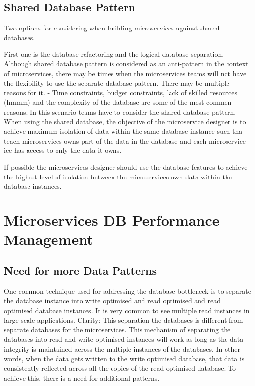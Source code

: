 \documentclass[a4paper, 11pt]{book}
\begin{document}
    \section{Shared Database Pattern}
    Two options for considering when building microservices against shared databases.

    First one is the database refactoring and the logical database separation.
    Although shared database pattern is considered as an anti-pattern in the context of microservices, there may be times when the microservices teams will not have the flexibility to use the separate database pattern.
    There may be multiple reasons for it.
    - Time constraints, budget constraints, lack of skilled resources (hmmm) and the complexity of the database are some of the most common reasons.
    In this scenario teams have to consider the shared database pattern.
    When using the shared database, the objective of the microservice designer is to achieve maximum isolation of data within the same database instance such tha teach microservices owns part of the data in the database and each microservice ice has access to only the data it owns.

    If possible the microservices designer should use the database features to achieve the highest level of isolation between the microservices own data within the database instances.


    \chapter{Microservices DB Performance Management}


    \section{Need for more Data Patterns}
    One common technique used for addressing the database bottleneck is to separate the database instance into write optimised and read optimised and read optimised database instances.
    It is very common to see multiple read instances in large scale applications.
    Clarity: This separation the databases is different from separate databases for the microservices.
    This mechanism of separating the databases into read and write optimised instances will work as long as the data integrity is maintained across the multiple instances of the databases.
    In other words, when the data gets written to the write optimised database, that data is consistently reflected across all the copies of the read optimised database.
    To achieve this, there is a need for additional patterns.
\end{document}
